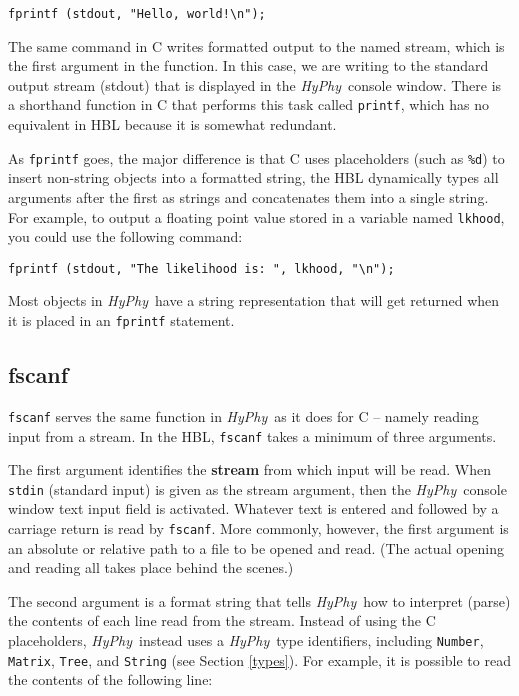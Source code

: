 \documentclass[12pt]{book}
\newcommand{\hyphy}{\textit{HyPhy}}
\begin{document}
\begin{leftbar}
\begin{verbatim}
fprintf (stdout, "Hello, world!\n");
\end{verbatim}
\end{leftbar}

The same command in C writes formatted output to the named stream, which is the first argument in the function.  In this case, we are writing to the standard output stream (stdout) that is displayed in the \hyphy\ console window.  There is a shorthand function in C that performs this task called {\tt printf}, which has no equivalent in HBL because it is somewhat redundant.

As {\tt fprintf} goes, the major difference is that C uses placeholders (such as {\tt \%d}) to insert non-string objects into a formatted string, the HBL dynamically types all arguments after the first as strings and concatenates them into a single string.  For example, to output a floating point value stored in a variable named {\tt lkhood}, you could use the following command:

\begin{leftbar}
\begin{verbatim}
fprintf (stdout, "The likelihood is: ", lkhood, "\n");
\end{verbatim}
\end{leftbar}

Most objects in \hyphy\ have a string representation that will get returned when it is placed in an {\tt fprintf} statement.  

\subsection {fscanf}

{\tt fscanf} serves the same function in \hyphy\ as it does for C -- namely reading input from a stream.  In the HBL, {\tt fscanf} takes a minimum of three arguments.  

The first argument identifies the {\bf stream} from which input will be read.  When {\tt stdin} (standard input) is given as the stream argument, then the \hyphy\ console window text input field is activated.  Whatever text is entered and followed by a carriage return is read by {\tt fscanf}.  More commonly, however, the first argument is an absolute or relative path to a file to be opened and read.  (The actual opening and reading all takes place behind the scenes.)  

The second argument is a format string that tells \hyphy\ how to interpret (parse) the contents of each line read from the stream.  Instead of using the C placeholders, \hyphy\ instead uses a \hyphy\ type identifiers, including {\tt Number}, {\tt Matrix}, {\tt Tree}, and {\tt String} (see Section \ref{types}).  For example, it is possible to read the contents of the following line:
\end{document}
